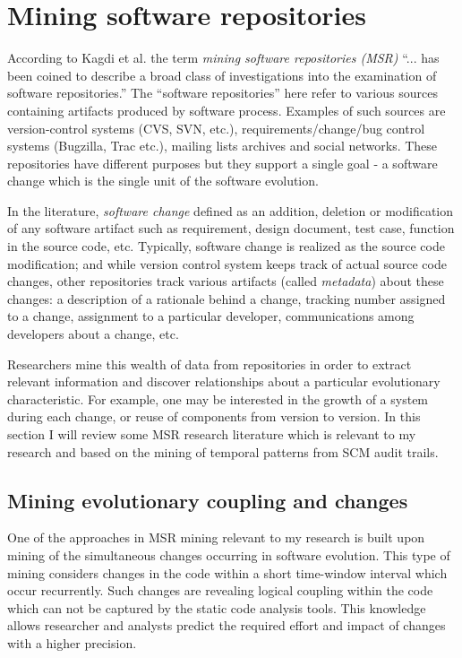 \section{Mining software repositories}\label{evolution.discovery}
According to Kagdi et al. \cite{citeulike:4534888} the term \textit{mining
software repositories (MSR)} ``... has been coined to describe a broad class of
investigations into the examination of software repositories.'' The ``software
repositories'' here refer to various sources containing artifacts produced by
software process. Examples of such sources are version-control systems (CVS,
SVN, etc.), requirements/change/bug control systems (Bugzilla, Trac etc.),
mailing lists archives and social networks. These repositories have different
purposes but they support a single goal - a software change which is the single
unit of the software evolution. 

In the literature, \textit{software change} defined as an addition, deletion or
modification of any software artifact such as requirement, design document, test
case, function in the source code, etc. Typically, software change is realized
as the source code modification; and while version control system keeps track of
actual source code changes, other repositories track various artifacts (called
\textit{metadata}) about these changes: a description of a rationale behind a
change, tracking number assigned to a change, assignment to a particular
developer, communications among developers about a change, etc.

Researchers mine this wealth of data from repositories in order to extract
relevant information and discover relationships about a particular evolutionary
characteristic. For example, one may be interested in the growth of a system
during each change, or reuse of components from version to version. In this
section I will review some MSR research literature which is relevant to my
research and based on the mining of temporal patterns from SCM audit trails.

\subsection{Mining evolutionary coupling and changes}
One of the approaches in MSR mining relevant to my research is built upon mining
of the simultaneous changes occurring in software evolution. This type of mining
considers changes in the code within a short time-window interval which occur
recurrently. Such changes are revealing logical coupling within the code which
can not be captured by the static code analysis tools. This knowledge allows
researcher and analysts predict the required effort and impact of changes with a
higher precision. 

